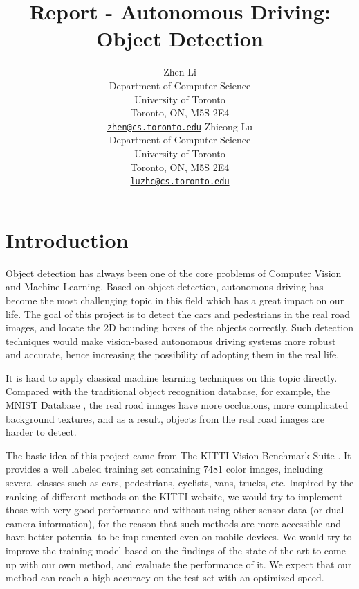 \documentclass{article} %
\title{Report - Autonomous Driving: Object Detection}
\author{
Zhen Li \\
Department of Computer Science\\
University of Toronto\\
Toronto, ON, M5S 2E4 \\
\href{mailto:zhen@cs.toronto.edu}{\texttt{zhen@cs.toronto.edu}}
\And
Zhicong Lu \\
Department of Computer Science\\
University of Toronto\\
Toronto, ON, M5S 2E4 \\
\href{mailto:luzhc@cs.toronto.edu}{\texttt{luzhc@cs.toronto.edu}}
}
\begin{document}
\maketitle

\section{Introduction}

Object detection has always been one of the core problems of Computer Vision and Machine Learning. Based on object detection, autonomous driving has become the most challenging topic in this field which has a great impact on our life. The goal of this project is to detect the cars and pedestrians in the real road images, and locate the 2D bounding boxes of the objects correctly. Such detection techniques would make vision-based autonomous driving systems more robust and accurate, hence increasing the possibility of adopting them in the real life. 

It is hard to apply classical machine learning techniques on this topic directly. Compared with the traditional object recognition database, for example, the MNIST Database \cite{lecun1998gradient}, the real road images have more occlusions, more complicated background textures, and as a result, objects from the real road images are harder to detect. 

The basic idea of this project came from The KITTI Vision Benchmark Suite \cite{Geiger2012CVPR}. It provides a well labeled training set containing $7481$ color images, including several classes such as cars, pedestrians, cyclists, vans, trucks, etc. Inspired by the ranking of different methods on the KITTI website, we would try to implement those with very good performance and without using other sensor data (or dual camera information), for the reason that such methods are more accessible and have better potential to be implemented even on mobile devices. We would try to improve the training model based on the findings of the state-of-the-art to come up with our own method, and evaluate the performance of it. We expect that our method can reach a high accuracy on the test set with an optimized speed. 
\end{document}
